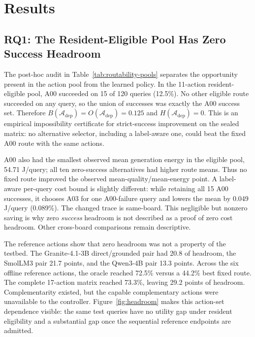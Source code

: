 \section{Results}
\label{sec:results}

\subsection{RQ1: The Resident-Eligible Pool Has Zero Success Headroom}



The post-hoc audit in Table~\ref{tab:routability-pools} separates the opportunity
present in the action pool from the learned policy. In the 11-action
resident-eligible pool, A00 succeeded on 15 of 120 queries (12.5\%). No other eligible route succeeded
on any query, so the union of successes was exactly the A00 success set. Therefore
$B(\mathcal{A}_{\mathrm{dep}})=O(\mathcal{A}_{\mathrm{dep}})=0.125$ and
$H(\mathcal{A}_{\mathrm{dep}})=0$. This is an empirical impossibility certificate
for strict-success improvement on the sealed matrix: no alternative selector,
including a label-aware one, could beat the fixed A00 route with the same actions.

A00 also had the smallest observed mean generation energy in the eligible pool,
54.71 J/query; all ten zero-success alternatives had higher route means. Thus no
fixed route improved the observed mean-quality/mean-energy point. A label-aware
per-query cost bound is slightly different: while retaining all 15 A00 successes,
it chooses A03 for one A00-failure query and lowers the mean by 0.049 J/query
(0.089\%). The changed trace is same-board. This negligible but nonzero saving is
why zero \emph{success} headroom is not described as a proof of zero cost
headroom. Other cross-board comparisons remain descriptive.

The reference actions show that zero headroom was not a property of the testbed.
The Granite-4.1-3B direct/grounded pair had 20.8 \pp{} of headroom, the SmolLM3 pair
21.7 points, and the Qwen3-4B pair 13.3 points. Across the six offline reference
actions, the oracle reached 72.5\% versus a 44.2\% best fixed route. The complete
17-action matrix reached 73.3\%, leaving 29.2 points of headroom. Complementarity
existed, but the capable complementary actions were unavailable to the controller.
Figure~\ref{fig:headroom} makes this action-set dependence visible: the same test
queries have no utility gap under resident eligibility and a substantial gap once
the sequential reference endpoints are admitted.

